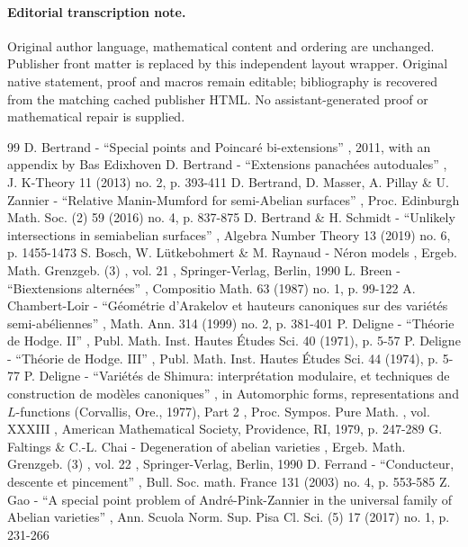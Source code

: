 \documentclass[11pt]{article}
\begin{document}
\paragraph{Editorial transcription note.}
Original author language, mathematical content and ordering are unchanged. Publisher front matter is replaced by this independent layout wrapper. Original native statement, proof and macros remain editable; bibliography is recovered from the matching cached publisher HTML. No assistant-generated proof or mathematical repair is supplied.
\clearpage

\begin{thebibliography}{99}
 D. Bertrand - “Special points and Poincaré bi-extensions” , 2011, with an appendix by Bas Edixhoven
 D. Bertrand - “Extensions panachées autoduales” , J. K-Theory 11 (2013) no. 2, p. 393-411
 D. Bertrand, D. Masser, A. Pillay \& U. Zannier - “Relative Manin-Mumford for semi-Abelian surfaces” , Proc. Edinburgh Math. Soc. (2) 59 (2016) no. 4, p. 837-875
 D. Bertrand \& H. Schmidt - “Unlikely intersections in semiabelian surfaces” , Algebra Number Theory 13 (2019) no. 6, p. 1455-1473
 S. Bosch, W. Lütkebohmert \& M. Raynaud - Néron models , Ergeb. Math. Grenzgeb. (3) , vol. 21 , Springer-Verlag, Berlin, 1990
 L. Breen - “Biextensions alternées” , Compositio Math. 63 (1987) no. 1, p. 99-122
 A. Chambert-Loir - “Géométrie d’Arakelov et hauteurs canoniques sur des variétés semi-abéliennes” , Math. Ann. 314 (1999) no. 2, p. 381-401
 P. Deligne - “Théorie de Hodge. II” , Publ. Math. Inst. Hautes Études Sci. 40 (1971), p. 5-57
 P. Deligne - “Théorie de Hodge. III” , Publ. Math. Inst. Hautes Études Sci. 44 (1974), p. 5-77
 P. Deligne - “Variétés de Shimura: interprétation modulaire, et techniques de construction de modèles canoniques” , in Automorphic forms, representations and $L$-functions (Corvallis, Ore., 1977), Part 2 , Proc. Sympos. Pure Math. , vol. XXXIII , American Mathematical Society, Providence, RI, 1979, p. 247-289
 G. Faltings \& C.-L. Chai - Degeneration of abelian varieties , Ergeb. Math. Grenzgeb. (3) , vol. 22 , Springer-Verlag, Berlin, 1990
 D. Ferrand - “Conducteur, descente et pincement” , Bull. Soc. math. France 131 (2003) no. 4, p. 553-585
 Z. Gao - “A special point problem of André-Pink-Zannier in the universal family of Abelian varieties” , Ann. Scuola Norm. Sup. Pisa Cl. Sci. (5) 17 (2017) no. 1, p. 231-266

\end{thebibliography}
\end{document}
